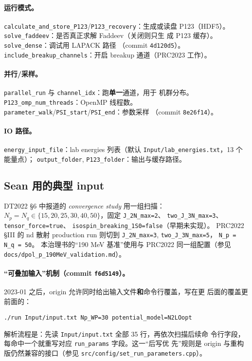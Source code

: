 \paragraph{运行模式。}
\texttt{calculate\_and\_store\_P123}/\texttt{P123\_recovery}：生成或读盘
P123（HDF5）。\texttt{solve\_faddeev}：是否真正求解 Faddeev（关闭则只生
成 P123 缓存）。\texttt{solve\_dense}：调试用 LAPACK 路径
（commit \texttt{4d120d5}）。
\texttt{include\_breakup\_channels}：开启 breakup 通道（PRC2023 工作）。

\paragraph{并行/采样。}
\texttt{parallel\_run} 与 \texttt{channel\_idx}：跑\textbf{单一}通道，用于
机群分布。\texttt{P123\_omp\_num\_threads}：OpenMP 线程数。
\texttt{parameter\_walk}/\texttt{PSI\_start}/\texttt{PSI\_end}：参数采样
（commit \texttt{8e26f14}）。

\paragraph{IO 路径。}
\texttt{energy\_input\_file}：lab energies 列表（默认
\texttt{Input/lab\_energies.txt}，13 个能量点）；
\texttt{output\_folder}, \texttt{P123\_folder}：输出与缓存路径。

\subsection{Sean 用的典型 input}

DT2022 §6 中报道的 \emph{convergence study} 用一组扫描：
$N_p = N_q \in \{15, 20, 25, 30, 40, 50\}$，固定 \texttt{J\_2N\_max=2}、
\texttt{two\_J\_3N\_max=3}、\texttt{tensor\_force=true}、
\texttt{isospin\_breaking\_1S0=false}（早期未实现）。
PRC2022 §III 的 nd 散射 production run 则切到
\texttt{J\_2N\_max=3}, \texttt{two\_J\_3N\_max=5}，
\texttt{N\_p = N\_q = 50}。
本治理书的“190 MeV 基准”使用与 PRC2022 同一组配置（参见
\texttt{docs/dpol\_p\_190MeV\_validation.md}）。

\paragraph{“可叠加输入”机制（commit \texttt{f6d5149}）。}
2023-01 之后，origin 允许同时给出输入文件\textbf{和}命令行覆盖，写在更
后面的覆盖更前面的：
\begin{lstlisting}[style=config]
./run Input/input.txt Np_WP=30 potential_model=N2LOopt
\end{lstlisting}
解析流程是：先读 \texttt{Input/input.txt} 全部 35 行，再依次扫描后续命
令行字段，每命中一个就重写对应 \texttt{run\_params} 字段。这一“后写优
先”规则是 origin 与重构版仍然兼容的接口（参见
\texttt{src/config/set\_run\_parameters.cpp}）。

